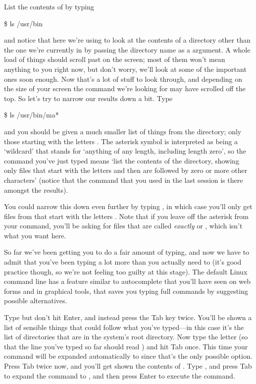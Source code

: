 List the contents of  by typing
\begin{ttoutenv}
\$ ls /usr/bin
\end{ttoutenv}

and notice that here we're using  to look at the contents of a directory other than the one we're currently in by passing the directory name as a argument. A whole load of things should scroll past on the screen; most of them won't mean anything to you right now, but don't worry, we'll look at some of the important ones soon enough. Now that's a lot of stuff to look through, and depending on the size of your screen the command we're looking for may have scrolled off the top. So let's try to narrow our results down a bit. Type 

\begin{ttoutenv}
\$ ls /usr/bin/ma*
\end{ttoutenv}


and you should be given a much smaller list of things from the  directory; only those starting with the letters . The asterisk symbol is interpreted as being a `wildcard' that stands for `anything of any length, including length zero', so the command you've just typed means `list the contents of the  directory, showing only files that start with the letters  and then are followed by zero or more other characters' (notice that the  command that you used in the last session is there amongst the results). 

You could narrow this down even further by typing , in which case you'll only get files from  that start with the letters . Note that if you leave off the asterisk from your command, you'll be asking for files that are called \textit{exactly}  or , which isn't what you want here.

So far we've been getting you to do a fair amount of typing, and now we have to admit that you've been typing a lot more than you actually need to (it's good practice though, so we're not feeling too guilty at this stage). The default Linux command line has a feature similar to autocomplete that you'll have seen on web forms and in graphical tools, that saves you typing full commands by suggesting possible alternatives. 

Type  but don't hit Enter, and instead press the Tab key twice. You'll be shown a list of sensible things that could follow what you've typed---in this case it's the list of directories that are in the system's root directory. Now type the letter  (so that the line you've typed so far should read ) and hit Tab once. This time your command will be expanded automatically to  since that's the only possible option. Press Tab twice now, and you'll get shown the contents of . Type , and press Tab to expand the command to , and then press Enter to execute the command.

